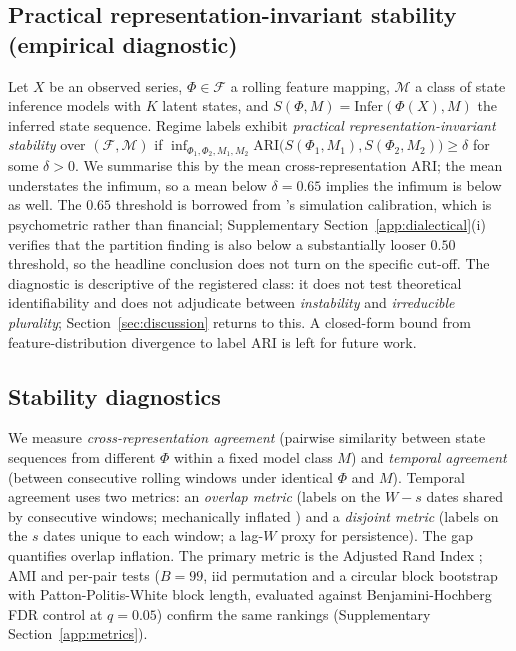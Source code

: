 \documentclass[preprint,12pt,authoryear]{elsarticle}
\begin{document}
\subsection{Practical representation-invariant stability (empirical diagnostic)}
\label{sec:diagnostic}

Let $X$ be an observed series, $\Phi \in \mathcal{F}$ a rolling feature mapping, $\mathcal{M}$ a class of state inference models with $K$ latent states, and $S(\Phi, M) = \mathrm{Infer}(\Phi(X), M)$ the inferred state sequence. Regime labels exhibit \emph{practical representation-invariant stability} over $(\mathcal{F}, \mathcal{M})$ if $\inf_{\Phi_1,\Phi_2,M_1,M_2} \mathrm{ARI}\big(S(\Phi_1,M_1), S(\Phi_2,M_2)\big) \ge \delta$ for some $\delta > 0$. We summarise this by the mean cross-representation ARI; the mean understates the infimum, so a mean below $\delta=0.65$ implies the infimum is below as well. The $0.65$ threshold is borrowed from \citet{Steinley2004}'s simulation calibration, which is psychometric rather than financial; Supplementary Section~\ref{app:dialectical}(i) verifies that the partition finding is also below a substantially looser $0.50$ threshold, so the headline conclusion does not turn on the specific cut-off. The diagnostic is descriptive of the registered class: it does not test theoretical identifiability and does not adjudicate between \emph{instability} and \emph{irreducible plurality}; Section~\ref{sec:discussion} returns to this. A closed-form bound from feature-distribution divergence to label ARI is left for future work.

\subsection{Stability diagnostics}

We measure \emph{cross-representation agreement} (pairwise similarity between state sequences from different $\Phi$ within a fixed model class $M$) and \emph{temporal agreement} (between consecutive rolling windows under identical $\Phi$ and $M$). Temporal agreement uses two metrics: an \emph{overlap metric} (labels on the $W-s$ dates shared by consecutive windows; mechanically inflated \citep{vonLuxburg2010}) and a \emph{disjoint metric} (labels on the $s$ dates unique to each window; a lag-$W$ proxy for persistence). The gap quantifies overlap inflation. The primary metric is the Adjusted Rand Index \citep{HubertArabie1985}; AMI \citep{VinhEppsBailey2010} and per-pair tests ($B=99$, iid permutation and a \citet{PolitisRomano1992CBB} circular block bootstrap with Patton-Politis-White block length, evaluated against Benjamini-Hochberg FDR control at $q=0.05$) confirm the same rankings (Supplementary Section~\ref{app:metrics}).
\end{document}
